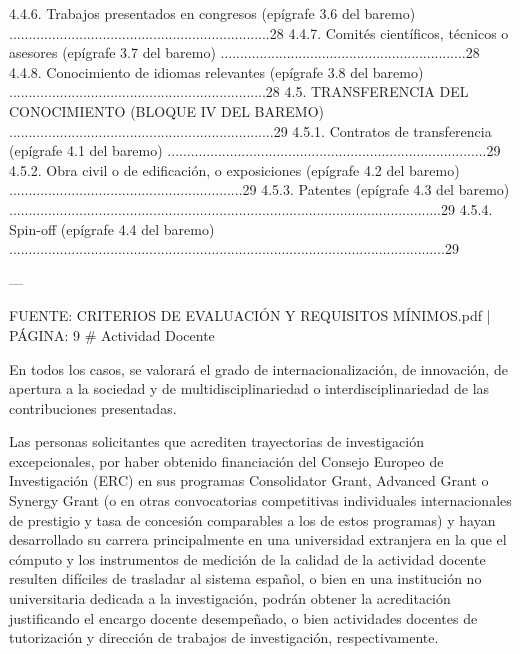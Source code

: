 \documentclass{article}
\begin{document}
\begin{itemize}
\begin{itemize}
\begin{scriptsize}
                  4.4.6. Trabajos presentados en congresos (epígrafe 3.6 del baremo) ...................................................................28
                  4.4.7. Comités científicos, técnicos o asesores (epígrafe 3.7 del baremo) ...............................................................28
                  4.4.8. Conocimiento de idiomas relevantes (epígrafe 3.8 del baremo) ..................................................................28
                  4.5. TRANSFERENCIA DEL CONOCIMIENTO (BLOQUE IV DEL BAREMO) ....................................................................29
                  4.5.1. Contratos de transferencia (epígrafe 4.1 del baremo) ..................................................................................29
                  4.5.2. Obra civil o de edificación, o exposiciones (epígrafe 4.2 del baremo) ............................................................29
                  4.5.3. Patentes (epígrafe 4.3 del baremo) ...............................................................................................................29
                  4.5.4. Spin-off (epígrafe 4.4 del baremo) ................................................................................................................29

                  ---

                  FUENTE: CRITERIOS DE EVALUACIÓN Y REQUISITOS MÍNIMOS.pdf | PÁGINA: 9
                  \# Actividad Docente

                  En todos los casos, se valorará el grado de internacionalización, de innovación, de apertura a la sociedad y de multidisciplinariedad o interdisciplinariedad de las contribuciones presentadas.

                  Las personas solicitantes que acrediten trayectorias de investigación excepcionales, por haber obtenido financiación del Consejo Europeo de Investigación (ERC) en sus programas Consolidator Grant, Advanced Grant o Synergy Grant (o en otras convocatorias competitivas individuales internacionales de prestigio y tasa de concesión comparables a los de estos programas) y hayan desarrollado su carrera principalmente en una universidad extranjera en la que el cómputo y los instrumentos de medición de la calidad de la actividad docente resulten difíciles de trasladar al sistema español, o bien en una institución no universitaria dedicada a la investigación, podrán obtener la acreditación justificando el encargo docente desempeñado, o bien actividades docentes de tutorización y dirección de trabajos de investigación, respectivamente.


\end{scriptsize}
\end{itemize}
\end{itemize}
\end{document}
